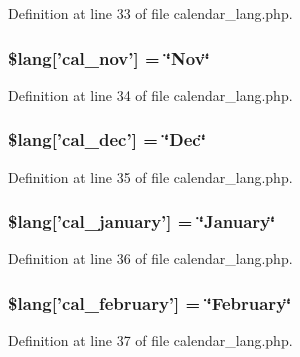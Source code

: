 Definition at line 33 of file calendar\-\_\-lang.\-php.

\subsubsection[{\$lang}]{\setlength{\rightskip}{0pt plus 5cm}\$lang['cal\-\_\-nov'] = \char`\"{}Nov\char`\"{}}\label{calendar__lang_8php_a6c8f862507c12a677f22d9df6bf92515}


Definition at line 34 of file calendar\-\_\-lang.\-php.

\subsubsection[{\$lang}]{\setlength{\rightskip}{0pt plus 5cm}\$lang['cal\-\_\-dec'] = \char`\"{}Dec\char`\"{}}\label{calendar__lang_8php_ab97feaeee2a9c0746ca0a3631c6f70db}


Definition at line 35 of file calendar\-\_\-lang.\-php.

\subsubsection[{\$lang}]{\setlength{\rightskip}{0pt plus 5cm}\$lang['cal\-\_\-january'] = \char`\"{}January\char`\"{}}\label{calendar__lang_8php_a8b4025982a3bddb1a5cfd4c37dd5e859}


Definition at line 36 of file calendar\-\_\-lang.\-php.

\subsubsection[{\$lang}]{\setlength{\rightskip}{0pt plus 5cm}\$lang['cal\-\_\-february'] = \char`\"{}February\char`\"{}}\label{calendar__lang_8php_a32a50b63add7abc253c9bc36f4fa6f72}


Definition at line 37 of file calendar\-\_\-lang.\-php.

